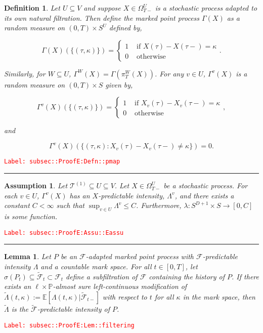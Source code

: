 \documentclass[12pt]{article}
\newcommand{\mb}{\mathbb}
\newcommand{\mc}{\mathcal}
\newcommand{\ra}{\rightarrow}
\newcommand{\te}{\text}
\newcommand{\tr}{\textcolor{red}}
\newcommand{\labe}[1]{\tr{\texttt{Label: #1}}}
\newcommand{\lin}{\rule{\linewidth}{0.4 pt}}
\newcommand{\pr}{\mb{P}}							%
\newcommand{\ex}[1]{\mb{E}\left[#1\right]}			%
\renewcommand{\v}{v}							%
\renewcommand{\U}{U}							%
\newcommand{\UU}{W}								%
\renewcommand{\S}{S}							%
\newcommand{\T}{T}								%
\renewcommand{\t}{t}							%
\newcommand{\sset}{\Omega}						%
\newcommand{\proj}{\pi}							%
\newcommand{\F}{\mc{F}}							%
\newcommand{\X}{X}								%
\newcommand{\vind}[1]{^{#1}}					%
\newcommand{\carp}[1]{^{#1}}					%
\newcommand{\vsi}[1]{^{#1}}						%
\newcommand{\cind}[1]{_{#1}}					%
\newcommand{\tp}[1]{(#1)}						%
\newcommand{\ts}[1]{_{#1}}						%
\newcommand{\const}{C}							%
\newcommand{\degr}{D}							%
\newcommand{\tree}{\mc{T}}						%
\newcommand{\sln}[1]{^{(#1)}}					%
\newcommand{\Sm}{\ell}							%
\newcommand{\alt}[1]{\widetilde{#1}}			%
\newcommand{\rt}{\tau}							%
\newcommand{\pmap}{\Gamma}						%
\renewcommand{\mark}{\kappa}					%
\newcommand{\rp}{P}								%
\newcommand{\ratee}{\Lambda}					%
\newcommand{\cratee}{\alt{\Lambda}} 			%
\newtheorem{lem}[thms]{Lemma}
\newtheorem{defn}[thms]{Definition}
\newtheorem{assu}[thms]{Assumption}
\begin{document}
\begin{defn}
Let \(\U\subseteq V\) and suppose \(\X \in \sset\vsi{\U}\ts{\T-}\) is a stochastic process adapted to its own natural filtration. Then define the marked point process \(\pmap(\X)\) as a random measure on \((0,\T) \times \S\carp{\U}\) defined by,

\[\pmap(\X)(\{(\rt,\mark)\}) = \begin{cases}
1 &\te{ if } \X\tp{\rt} - \X\tp{\rt-} = \mark\\
0 &\te{ otherwise}
\end{cases}.\]

Similarly, for \(\UU \subseteq \U\), \(\pmap\vind{\UU}(\X) = \pmap\left(\proj\vsi{\UU}\ts{\T}(\X)\right)\). For any \(\v\in \U\), \(\pmap\vind{\v}(\X)\) is a random measure on \((0,\T) \times \S\) given by,

\[\pmap\vind{\v}(\X)(\{(\rt,\mark)\}) = \begin{cases}
1 &\te{ if } \X\cind{\v}\tp{\rt} - \X\cind{\v}\tp{\rt-} = \mark\\
0 &\te{ otherwise}
\end{cases},\]

and

\[\pmap\vind{\v}(\X)(\{(\rt,\mark): \X\cind{\v}\tp{\rt} - \X\cind{\v}\tp{\rt-} \neq \mark\}) = 0.\]
\label{subsec::ProofE:Defn::pmap}
\end{defn}
\labe{subsec::ProofE:Defn::pmap}

\lin

\begin{assu}
Let \(\tree\sln{1}\subseteq\U \subseteq V\). Let \(\X\in \sset\vsi{\U}\ts{\T-}\) be a stochastic process. For each \(\v\in \U\), \(\pmap\vind{\v}(\X)\) has an \(\X\)-predictable intensity, \(\ratee\vind{\v}\), and there exists a constant \(\const < \infty\) such that \(\sup_{\v\in\U} \ratee\vind{\v} \leq \const\). Furthermore, \(\lambda: \S\carp{\degr+1}\times \S\ra[0,\const]\) is some function.
\label{subsec::ProofE:Assu::Eassu}
\end{assu}
\labe{subsec::ProofE:Assu::Eassu}

\lin

\begin{lem}
Let \(\rp\) be an \(\F\)-adapted marked point process with \(\F\)-predictable intensity \(\ratee\) and a countable mark space. For all \(\t \in [0,\T]\), let \(\sigma(\rp\ts{\t}) \subseteq \alt{\F}\ts{\t}\subset \F\ts{\t}\) define a subfiltration of \(\F\) containing the history of \(\rp\). If there exists an \(\Sm\times \pr\)-almost sure left-continuous modification of \(\cratee(\t,\mark) := \ex{\ratee(\t,\mark)|\alt{\F}\ts{\t-}}\) with respect to \(\t\) for all \(\mark\) in the mark space, then \(\cratee\) is the \(\alt{\F}\)-predictable intensity of \(\rp\).
\label{subsec::ProofE:Lem::filtering}
\end{lem}
\labe{subsec::ProofE:Lem::filtering}
\end{document}
